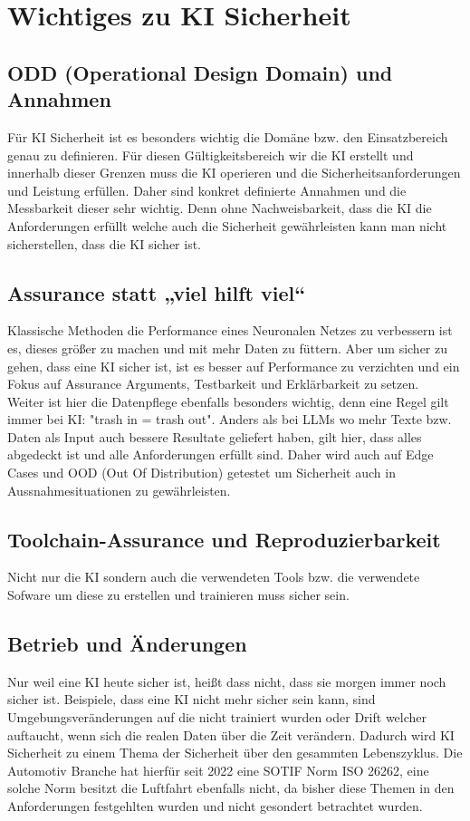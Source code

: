 \chapter{Wichtiges zu KI Sicherheit}
\section{ODD (Operational Design Domain) und Annahmen}
Für KI Sicherheit ist es besonders wichtig die Domäne bzw. den Einsatzbereich genau zu definieren. 
Für diesen Gültigkeitsbereich wir die KI erstellt und innerhalb dieser Grenzen muss die KI operieren 
und die Sicherheitsanforderungen und Leistung erfüllen. Daher sind konkret definierte Annahmen und 
die Messbarkeit dieser sehr wichtig. Denn ohne Nachweisbarkeit, dass die KI die Anforderungen erfüllt 
welche auch die Sicherheit gewährleisten kann man nicht sicherstellen, dass die KI sicher ist.
\section{Assurance statt „viel hilft viel“}
Klassische Methoden die Performance eines Neuronalen Netzes zu verbessern ist es, dieses größer zu machen 
und mit mehr Daten zu füttern. Aber um sicher zu gehen, dass eine KI sicher ist, ist es besser auf 
Performance zu verzichten und ein Fokus auf Assurance Arguments, Testbarkeit und Erklärbarkeit zu setzen.\\
Weiter ist hier die Datenpflege ebenfalls besonders wichtig, denn eine Regel gilt immer bei KI: "trash in = trash out".
Anders als bei LLMs wo mehr Texte bzw. Daten als Input auch bessere Resultate geliefert haben, gilt 
hier, dass alles abgedeckt ist und alle Anforderungen erfüllt sind. Daher wird auch auf Edge Cases 
und OOD (Out Of Distribution) getestet um Sicherheit auch in Aussnahmesituationen zu gewährleisten.
\section{Toolchain-Assurance und Reproduzierbarkeit}
Nicht nur die KI sondern auch die verwendeten Tools bzw. die verwendete Sofware um diese zu erstellen 
und trainieren muss sicher sein.
\section{Betrieb und Änderungen}
Nur weil eine KI heute sicher ist, heißt dass nicht, dass sie morgen immer noch sicher ist. 
Beispiele, dass eine KI nicht mehr sicher sein kann, sind Umgebungsveränderungen auf die nicht trainiert wurden 
oder Drift welcher auftaucht, wenn sich die realen Daten über die Zeit verändern. 
Dadurch wird KI Sicherheit zu einem Thema der Sicherheit über den gesammten Lebenszyklus. 
Die Automotiv Branche hat hierfür seit 2022 eine SOTIF Norm ISO 26262, eine solche Norm besitzt die Luftfahrt ebenfalls nicht, 
da bisher diese Themen in den Anforderungen festgehlten wurden und nicht gesondert betrachtet wurden.